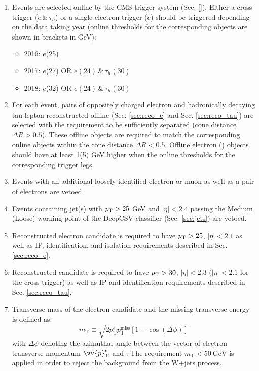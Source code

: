 \begin{enumerate}
    \item Events are selected online by the CMS trigger system (Sec. \ref{}). Either a cross trigger ($e \, \& \, \tau_h$) or a single electron trigger ($e$) should be triggered depending on the data taking year (online \pt thresholds for the corresponding objects are shown in brackets in GeV):
    \begin{itemize}
        \item 2016: $e$(25)
        \item 2017: $e$(27) OR $e(24) \, \& \, \tau_h(30)$
        \item 2018: $e$(32) OR $e(24) \, \& \, \tau_h(30)$
    \end{itemize}
    
    \item For each event, pairs of oppositely charged electron and hadronically decaying tau lepton reconstructed offline (Sec. \ref{sec:reco_e} and Sec. \ref{sec:reco_tau}) are selected with the requirement to be sufficiently separated (cone distance $\Delta R > 0.5$). These offline objects are required to match the corresponding online objects within the cone distance $\Delta R < 0.5$. Offline electron (\tauh) objects should have \pt at least 1(5) GeV higher when the online \pt thresholds for the corresponding trigger legs. 
    
    \item Events with an additional loosely identified electron or muon as well as a pair of electrons are vetoed.
    
    \item Events containing jet(s) with $p_{\text{T}} > 25$ GeV and $|\eta| < 2.4$ passing the Medium (Loose) working point of the DeepCSV classifier (Sec. \ref{sec:jets}) are vetoed. 
    
    \item Reconstructed electron candidate is required to have $p_{\text{T}} > 25$, $|\eta| < 2.1$ as well as IP, identification, and isolation requirements described in Sec. \ref{sec:reco_e}. 
    
    \item Reconstructed \tauh candidate is required to have $p_{\text{T}} > 30$, $|\eta| < 2.3$ ($|\eta| < 2.1$ for the cross trigger) as well as IP and identification requirements described in Sec. \ref{sec:reco_tau}.
    
    \item Transverse mass of the electron candidate and the missing transverse energy \met is defined as:
    \begin{equation}
        m_\text{T} \equiv \sqrt{2p_\text{T}^e p_\text{T}^\text{miss}[1-\cos(\Delta\phi)]}
    \end{equation}
    with $\Delta\phi$ denoting the azimuthal angle between the vector of electron transverse momentum $\vv{p}_\text{T}^e$ and \met. The requirement $m_\text{T} < 50 ~\text{GeV}$ is applied in order to reject the background from the W+jets process.
    

\end{enumerate}
